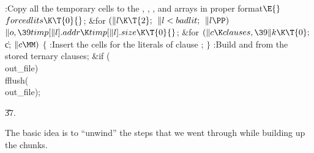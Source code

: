 \B{}:Copy all the temporary cells to the , %
, , and  arrays in proper format\X${}%
\E{}$\6
$\\{forcedlits}\K\T{0}{}$;\6
\&{for} ${}(\|l\K\T{2};{}$ ${}\|l<\\{badlit};{}$ ${}\|l\PP){}$\1\5
${}\|o,\39\\{timp}[\|l].\\{addr}\K\\{timp}[\|l].\\{size}\K\T{0}{}$;\2\6
\&{for} ${}(\|c\K\\{clauses},\39\|k\K\T{0};{}$ \|c; ${}\|c\MM){}$\5
${}\{{}$\1\6
:Insert the cells for the literals of clause \X;\6
\4${}\}{}$\2\6
:Build  and  from the stored ternary clauses\X;\6
\&{if} (\\{out\_file})\1\5
\\{fflush}(\\{out\_file});\2\par
\U37.\fi

The basic idea is to ``unwind'' the steps that we went
through while
building up the chunks.

